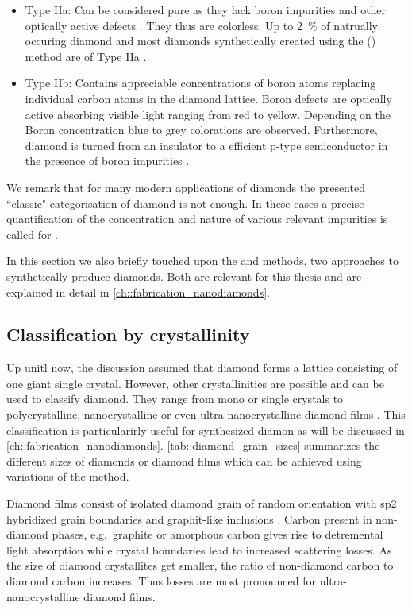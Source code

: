       \begin{itemize}
        \item Type IIa: Can be considered pure as they lack boron impurities and other optically active defects \cite{neu::84}. They thus are colorless. Up to \SI{2}{\percent} of natrually occuring diamond and most diamonds synthetically created using the \cvd (\CVD) method are of Type IIa \cite{steinmetz::58}.
        \item Type IIb: Contains appreciable concentrations of boron atoms replacing individual carbon atoms in the diamond lattice. Boron defects are optically active absorbing visible light ranging from red to yellow. Depending on the Boron concentration blue to grey colorations are observed. Furthermore, diamond is turned from an insulator to a efficient p-type semiconductor in the presence of boron impurities \cite{steinmetz::59}.
      \end{itemize}

      We remark that for many modern applications of diamonds the presented ``classic" categorisation of diamond is not enough. In these cases a precise quantification of the concentration and nature of various relevant impurities is called for \cite{neu::85, neu::86}.

      In this section we also briefly touched upon the \CVD and \HPHT methods, two approaches to synthetically produce diamonds. Both are relevant for this thesis and are explained in detail in \autoref{ch::fabrication_nanodiamonds}.

    \subsection{Classification by crystallinity}

      Up unitl now, the discussion assumed that diamond forms a lattice consisting of one giant single crystal. However, other crystallinities are possible and can be used to classify diamond.
      They range from mono or single crystals to polycrystalline, nanocrystalline or even ultra-nanocrystalline diamond films \cite{steinmetz::62}. This classification is particularirly useful for synthesized diamon as will be discussed in \autoref{ch::fabrication_nanodiamonds}. \autoref{tab::diamond_grain_sizes} summarizes the different sizes of diamonds or diamond films which can be achieved using variations of the \CVD method.

      Diamond films consist of isolated diamond grain of random orientation with sp2 hybridized grain boundaries and graphit-like inclusions \cite{janine::thesis}. Carbon present in non-diamond phases, e.g.\ graphite or amorphous carbon gives rise to detremental light absorption while crystal boundaries lead to increased scattering losses. As the size of diamond crystallites get smaller, the ratio of non-diamond carbon to diamond carbon increases. Thus losses are most pronounced for ultra-nanocrystalline diamond films.

